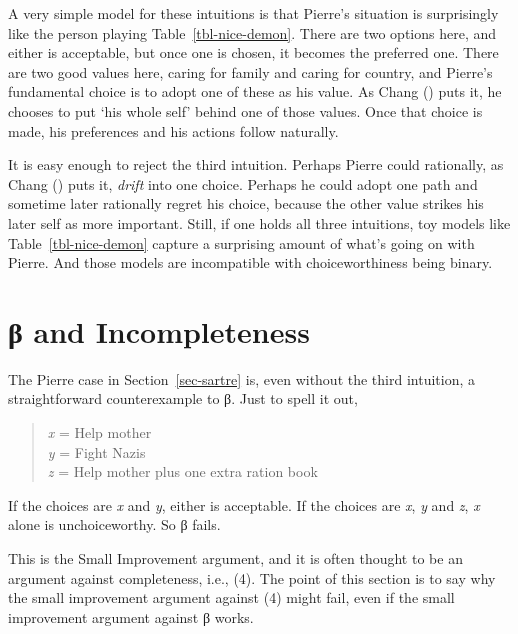 \documentclass[
  11pt,
  letterpaper,
  DIV=11,
  numbers=noendperiod,
  twoside]{scrartcl}
\begin{document}
A very simple model for these intuitions is that Pierre's situation is
surprisingly like the person playing Table~\ref{tbl-nice-demon}. There
are two options here, and either is acceptable, but once one is chosen,
it becomes the preferred one. There are two good values here, caring for
family and caring for country, and Pierre's fundamental choice is to
adopt one of these as his value. As Chang
() puts it, he chooses to put `his whole
self' behind one of those values. Once that choice is made, his
preferences and his actions follow naturally.

It is easy enough to reject the third intuition. Perhaps Pierre could
rationally, as Chang () puts it,
\emph{drift} into one choice. Perhaps he could adopt one path and
sometime later rationally regret his choice, because the other value
strikes his later self as more important. Still, if one holds all three
intuitions, toy models like Table~\ref{tbl-nice-demon} capture a
surprising amount of what's going on with Pierre. And those models are
incompatible with choiceworthiness being binary.

\section{β and Incompleteness}\label{sec-dorr}

The Pierre case in Section~\ref{sec-sartre} is, even without the third
intuition, a straightforward counterexample to β. Just to spell it out,

\begin{quote}
\emph{x} = Help mother\\
\emph{y} = Fight Nazis\\
\emph{z} = Help mother plus one extra ration book
\end{quote}

If the choices are \emph{x} and \emph{y}, either is acceptable. If the
choices are \emph{x}, \emph{y} and \emph{z}, \emph{x} alone is
unchoiceworthy. So β fails.

This is the Small Improvement argument, and it is often thought to be an
argument against completeness, i.e., (4). The point of this section is
to say why the small improvement argument against (4) might fail, even
if the small improvement argument against β works.
\end{document}
